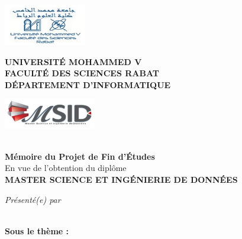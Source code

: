 \begin{titlepage}
    \begin{center}
        \begin{minipage}{3cm}
            \begin{center}
            \includegraphics[height=1.8cm]{./images/Logo_FSR.jpg}
            \end{center}
        \end{minipage} \hfill
        \begin{minipage}{9cm}
            \begin{center}
            \textbf{UNIVERSITÉ MOHAMMED V }\\[0.1cm]
            \textbf{FACULTÉ DES SCIENCES RABAT}\\[0.1cm]
            \textbf{DÉPARTEMENT D'INFORMATIQUE}
            \end{center}
        \end{minipage}\hfill
        \begin{minipage}{3cm}
            \begin{center}
            \includegraphics[height=1.3cm]{./images/Logo_MSID_invisible.png}
        \end{center}
        \end{minipage}
    \textsc{\Large }\\[1.5cm]
    {\large \bfseries Mémoire du Projet de Fin d'\uppercase{é}tudes}\\[0.5cm]
    {\large En vue de l'obtention du diplôme}\\[1cm]
    {\huge \bfseries \uppercase{Master Science et Ingénierie de Données} \\[0.5cm] }
    \begin{center} 
    \large
    \emph{Présenté(e) par } \\ [0.2cm]
        \bfseries \textbf{\myname}\\
      \end{center} 
    {\large \bfseries   Sous le thème :}\\[0.5cm]
    

\end{center}
\end{titlepage}
